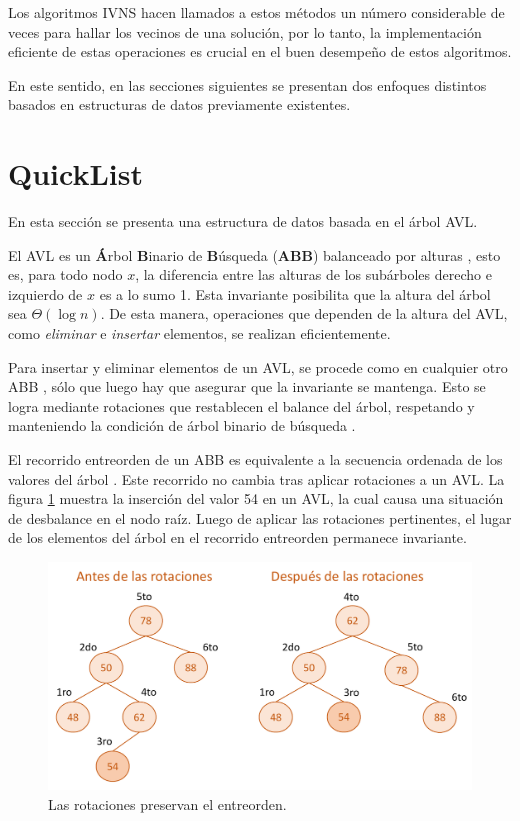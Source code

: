 \documentclass[a4paper,10pt,twocolumn]{article}
\begin{document}
  Los algoritmos IVNS hacen llamados a estos métodos un número considerable de veces
  para hallar los vecinos de una solución,
  por lo tanto, la implementación eficiente de estas operaciones es crucial en el buen
  desempeño de estos algoritmos.
  
  En este sentido, en las secciones siguientes se presentan dos enfoques distintos 
  basados en estructuras de datos previamente existentes.
\section{QuickList}\label{sec:quickL}
  En esta sección se presenta una estructura de datos basada en el árbol AVL.
  
  El AVL es un \textbf{Á}rbol \textbf{B}inario de \textbf{B}úsqueda (\textbf{ABB}) 
  balanceado por alturas \cite[pág. 296]{MIT2}, esto es, para todo nodo $ x $, la diferencia entre 
  las alturas de los subárboles derecho e izquierdo de $ x $ es a lo sumo 1. Esta 
  invariante posibilita que la altura del árbol sea $ \Theta(\log n) $. De esta manera, 
  operaciones que dependen de la altura del AVL, como \textit{eliminar} e 
  \textit{insertar} elementos, se realizan eficientemente.
  
  Para insertar y eliminar elementos de un AVL, se procede como en cualquier otro ABB 
  \cite[pág. 261]{MIT2}, sólo que luego hay que asegurar que la invariante se mantenga. 
  Esto se logra mediante rotaciones que restablecen el balance del árbol, respetando y 
  manteniendo la condición de árbol binario de búsqueda \cite{AVL}.
  
  El recorrido entreorden de un ABB es equivalente a la secuencia ordenada de los 
  valores del árbol \cite[pág. 254]{MIT2}. Este recorrido no cambia tras aplicar 
  rotaciones a un AVL. La figura \ref{fig:AVL_rotations} muestra la inserción del valor
  54 en un AVL, la cual causa una situación de desbalance en el nodo raíz. Luego de 
  aplicar las rotaciones pertinentes, el lugar de los elementos del árbol en el recorrido 
  entreorden permanece invariante.
  
  \begin{figure}[htb]
  	\centering
  	\includegraphics[scale=.42]{Graphics/AVL_rotations.pdf}
  	\caption{Las rotaciones preservan el entreorden.}\label{fig:AVL_rotations}
  \end{figure}
\end{document}
